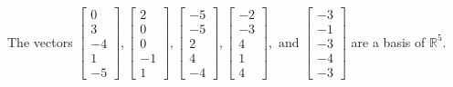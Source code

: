 \begin{exercise}
\begin{exerciseStatement}
  \end{exerciseStatement}
  \begin{exerciseAnswer}
   The vectors \(\left[\begin{array}{r}
0 \\
3 \\
-4 \\
1 \\
-5
\end{array}\right] , \left[\begin{array}{r}
2 \\
0 \\
0 \\
-1 \\
1
\end{array}\right] , \left[\begin{array}{r}
-5 \\
-5 \\
2 \\
4 \\
-4
\end{array}\right] , \left[\begin{array}{r}
-2 \\
-3 \\
4 \\
1 \\
4
\end{array}\right] , \text{ and } \left[\begin{array}{r}
-3 \\
-1 \\
-3 \\
-4 \\
-3
\end{array}\right]\) 
  	 are  a basis of \(\mathbb{R}^5\).
  


  \end{exerciseAnswer}
\end{exercise}